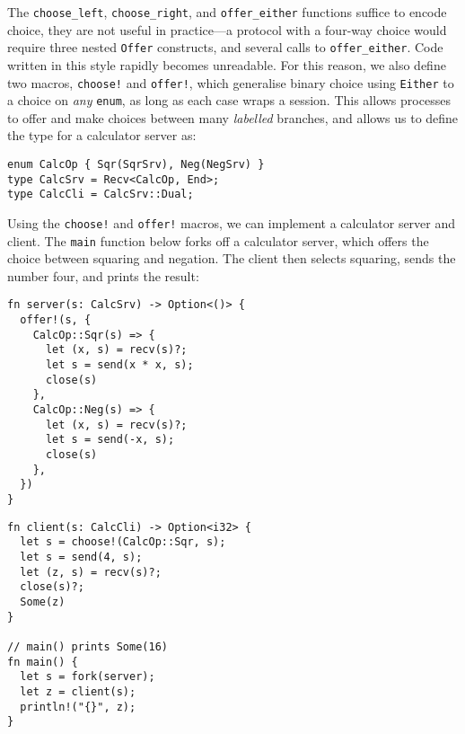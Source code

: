 \documentclass[copyright,creativecommons]{eptcs}
\begin{document}
The \lstinline{choose_left}, \lstinline{choose_right}, and \lstinline{offer_either} functions suffice to encode choice, they are not useful in practice---a protocol with a four-way choice would require three nested \lstinline{Offer} constructs, and several calls to \lstinline{offer_either}. Code written in this style rapidly becomes unreadable. For this reason, we also define two macros, \lstinline{choose!} and \lstinline{offer!}, which generalise binary choice using \lstinline{Either} to a choice on \emph{any} \lstinline{enum}, as long as each case wraps a session. This allows processes to offer and make choices between many \emph{labelled} branches, and allows us to define the type for a calculator server as:
\begin{lstlisting}
enum CalcOp { Sqr(SqrSrv), Neg(NegSrv) }
type CalcSrv = Recv<CalcOp, End>;
type CalcCli = CalcSrv::Dual;
\end{lstlisting}
Using the \lstinline{choose!} and \lstinline{offer!} macros, we can implement a calculator server and client. The \lstinline{main} function below forks off a calculator server, which offers the choice between squaring and negation. The client then selects squaring, sends the number four, and prints the result:

\begin{minipage}[t]{0.5\linewidth}
\begin{lstlisting}
fn server(s: CalcSrv) -> Option<()> {
  offer!(s, {
    CalcOp::Sqr(s) => {
      let (x, s) = recv(s)?;
      let s = send(x * x, s);
      close(s)
    },
    CalcOp::Neg(s) => {
      let (x, s) = recv(s)?;
      let s = send(-x, s);
      close(s)
    },
  })
}
\end{lstlisting}
\end{minipage}%
\begin{minipage}[t]{0.5\linewidth}
\begin{lstlisting}
fn client(s: CalcCli) -> Option<i32> {
  let s = choose!(CalcOp::Sqr, s);
  let s = send(4, s);
  let (z, s) = recv(s)?;
  close(s)?;
  Some(z)
}

// main() prints Some(16)
fn main() {
  let s = fork(server);
  let z = client(s);
  println!("{}", z);
}
\end{lstlisting}
\end{minipage}
\end{document}
